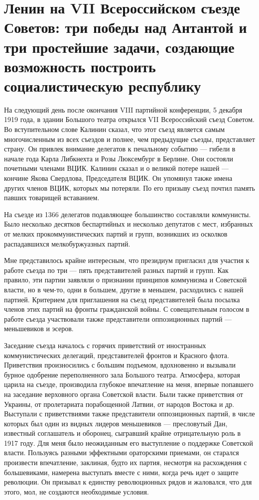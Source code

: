 \documentclass[12pt, a4paper, openany]{book}
\begin{document}
\newpage
\section[Ленин на VII Всероссийском съезде Советов: три победы над Антантой и три простейшие задачи, создающие возможность построить социалистическую республику]{\center \textbf{Ленин на VII Всероссийском съезде Советов: три победы над Антантой и три простейшие задачи, создающие возможность построить социалистическую республику}}


На следующий день после окончания VIII партийной конференции, 5 декабря 1919 года, в здании Большого театра открылся VII Всероссийский съезд Советом. Во вступительном слове Калинин сказал, что этот съезд является самым многочисленным из всех съездов и полнее, чем предыдущие съезды, представляет страну. Он привлек внимание делегатов к печальному событию — гибели в начале года Карла Либкнехта и Розы Люксембург в Берлине. Они состояли почетными членами ВЦИК. Калинин сказал и о великой потере нашей — кончине Якова Свердлова, Председателя ВЦИК. Он упомянул также имена других членов ВЦИК, которых мы потеряли. По его призыву съезд почтил память павших товарищей вставанием.

На съезде из 1366 делегатов подавляющее большинство составляли коммунисты. Было несколько десятков беспартийных и несколько депутатов с мест, избранных от мелких прокоммунистических партий и групп, возникших из осколков распадавшихся мелкобуржуазных партий.

Мне представилось крайне интересным, что президиум пригласил для участия к работе съезда по три — пять представителей разных партий и групп. Как правило, эти партии заявляли о признании принципов коммунизма и Советской власти, но в чем-то, одни в большем, другие в меньшем, расходились с нашей партией. Критерием для приглашения на съезд представителей была посылка членов этих партий на фронты гражданской войны. С совещательным голосом в работе съезда участвовали также представители оппозиционных партий — меньшевиков и эсеров.

Заседание съезда началось с горячих приветствий от иностранных коммунистических делегаций, представителей фронтов и Красного флота. Приветствия произносились с большим подъемом, вдохновенно и вызывали бурное одобрение переполненного зала Большого театра. Атмосфера, которая царила на съезде, производила глубокое впечатление на меня, впервые попавшего на заседание верховного органа Советской власти. Были также приветствия от Украины, от пролетариата порабощенной Латвии, от народов Востока и др. Выступали с приветствиями также представители оппозиционных партий, в числе которых был один из видных лидеров меньшевиков — пресловутый Дан, известный соглашатель и оборонец, сыгравший крайне отрицательную роль в 1917 году. Для меня было неожиданным его выступление о поддержке Советской власти. Пользуясь разными эффектными ораторскими приемами, он старался произвести впечатление, заклиная, будто их партия, несмотря на расхождения с большевиками, намерена выступать вместе с ними, когда речь идет о защите революции. Он призывал к единству революционных рядов и жаловался, что для этого, мол, не создаются необходимые условия.
\end{document}
